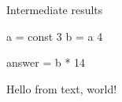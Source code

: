 




Intermediate results

\begin{code}
  a = const 3
  b = a 4
\end{code}


\begin{code}
answer = b * 14
\end{code}



Hello from text,
world!
